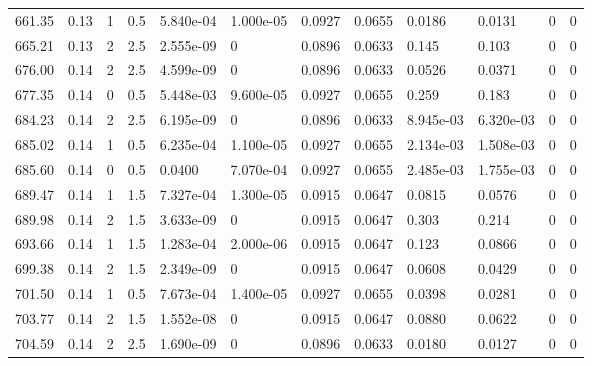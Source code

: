 \documentclass[preview]{standalone}
\begin{document}
{{{{\begin{tabular}{L{1.2cm}C{1.2cm} C{0.3cm}C{0.5cm} C{1.4cm}C{1.4cm} C{1.4cm}C{1.4cm} C{1.6cm}C{1.6cm} C{1.6cm}C{1.6cm}}
  661.35  &  0.13  & 1     & 0.5 &  5.840e-04  & 1.000e-05  &  0.0927&   0.0655& 0.0186 & 0.0131   &  0 & 0  \\ 
  665.21  &  0.13  & 2     & 2.5 &  2.555e-09  & 0  &  0.0896&   0.0633& 0.145 & 0.103   &  0 & 0  \\ 
  676.00  &  0.14  & 2     & 2.5 &  4.599e-09  & 0  &  0.0896&   0.0633& 0.0526 & 0.0371   &  0 & 0  \\ 
  677.35  &  0.14  & 0     & 0.5 &  5.448e-03  & 9.600e-05  &  0.0927&   0.0655& 0.259 & 0.183   &  0 & 0  \\ 
  684.23  &  0.14  & 2     & 2.5 &  6.195e-09  & 0  &  0.0896&   0.0633& 8.945e-03 & 6.320e-03   &  0 & 0  \\ 
  685.02  &  0.14  & 1     & 0.5 &  6.235e-04  & 1.100e-05  &  0.0927&   0.0655& 2.134e-03 & 1.508e-03   &  0 & 0  \\ 
  685.60  &  0.14  & 0     & 0.5 &  0.0400  & 7.070e-04  &  0.0927&   0.0655& 2.485e-03 & 1.755e-03   &  0 & 0  \\ 
  689.47  &  0.14  & 1     & 1.5 &  7.327e-04  & 1.300e-05  &  0.0915&   0.0647& 0.0815 & 0.0576   &  0 & 0  \\ 
  689.98  &  0.14  & 2     & 1.5 &  3.633e-09  & 0  &  0.0915&   0.0647& 0.303 & 0.214   &  0 & 0  \\ 
  693.66  &  0.14  & 1     & 1.5 &  1.283e-04  & 2.000e-06  &  0.0915&   0.0647& 0.123 & 0.0866   &  0 & 0  \\ 
  699.38  &  0.14  & 2     & 1.5 &  2.349e-09  & 0  &  0.0915&   0.0647& 0.0608 & 0.0429   &  0 & 0  \\ 
  701.50  &  0.14  & 1     & 0.5 &  7.673e-04  & 1.400e-05  &  0.0927&   0.0655& 0.0398 & 0.0281   &  0 & 0  \\ 
  703.77  &  0.14  & 2     & 1.5 &  1.552e-08  & 0  &  0.0915&   0.0647& 0.0880 & 0.0622   &  0 & 0  \\ 
  704.59  &  0.14  & 2     & 2.5 &  1.690e-09  & 0  &  0.0896&   0.0633& 0.0180 & 0.0127   &  0 & 0  \\ 
\hline 
\end{tabular} 

}}}}
\end{document}
